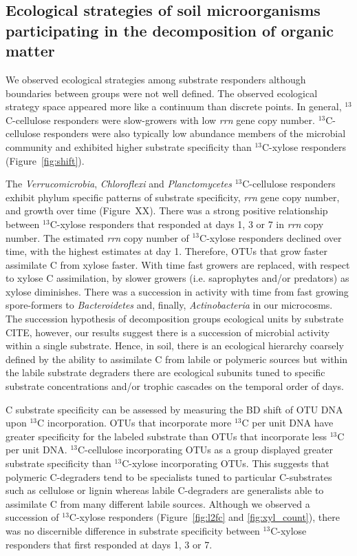\subsection{Ecological strategies of soil microorganisms participating in the
decomposition of organic matter}
We observed ecological strategies among substrate responders although
boundaries between groups were not well defined. The observed ecological
strategy space appeared more like a continuum than discrete points. In general,
$^{13}$C-cellulose responders were slow-growers with low \textit{rrn} gene copy
number. $^{13}$C-cellulose responders were also typically low abundance members
of the microbial community and exhibited higher substrate specificity than
$^{13}$C-xylose responders (Figure~\ref{fig:shift}). 

The \textit{Verrucomicrobia},
\textit{Chloroflexi} and \textit{Planctomycetes} $^{13}$C-cellulose responders exhibit 
phylum specific patterns of
substrate specificity, \textit{rrn} gene copy number, and growth over time (Figure~XX). There was a strong positive relationship between $^{13}$C-xylose
responders that responded at days 1,
3 or 7 in \textit{rrn} copy number. The estimated \textit{rrn} copy number of $^{13}$C-xylose responders declined over time, with the highest estimates at day 1. Therefore, OTUs that
grow faster assimilate C from xylose faster. With time fast growers
are replaced, with respect to xylose C assimilation, by slower growers (i.e. saprophytes and/or predators) as xylose diminishes. There was a succession in
activity with time from fast growing spore-formers to \textit{Bacteroidetes} and, finally, \textit{Actinobacteria} in our microcosms. The succession
hypothesis of decomposition groups ecological units by substrate CITE, however,
our results suggest there is a succession of microbial activity within
a single substrate. Hence, in soil, there is an ecological hierarchy coarsely
defined by the ability to assimilate C from labile or polymeric sources but
within the labile substrate degraders there are ecological subunits tuned to
specific substrate concentrations and/or trophic cascades on the temporal order
of days.

C substrate specificity can be assessed by measuring the BD shift of OTU DNA
upon $^{13}$C incorporation. OTUs that incorporate more $^{13}$C per unit DNA
have greater specificity for the labeled substrate than OTUs that incorporate
less $^{13}$C per unit DNA. $^{13}$C-cellulose incorporating OTUs as a group
displayed greater substrate specificity than $^{13}$C-xylose incorporating
OTUs. This suggests that polymeric C-degraders tend to be specialists tuned to
particular C-substrates such as cellulose or lignin whereas labile C-degraders
are generalists able to assimilate C from many different labile sources.
Although we observed a succession of $^{13}$C-xylose responders
(Figure~\ref{fig:l2fc} and \ref{fig:xyl_count}), there was no discernible
difference in substrate specificity between $^{13}$C-xylose responders that
first responded at days 1, 3 or 7. 

